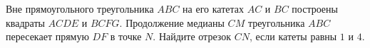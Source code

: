 \begin{ex}
	\begin{condition}
		Вне прямоугольного треугольника \( ABC  \) на его катетах \( AC \) и \( BC  \) построены квадраты \( ACDE  \) и \( BCFG \). Продолжение медианы \( CM \) треугольника \( ABC  \) пересекает прямую \( DF  \) в точке \( N \). Найдите отрезок \( CN \), если катеты равны \( 1  \) и \( 4 \).
	\end{condition}
\end{ex}